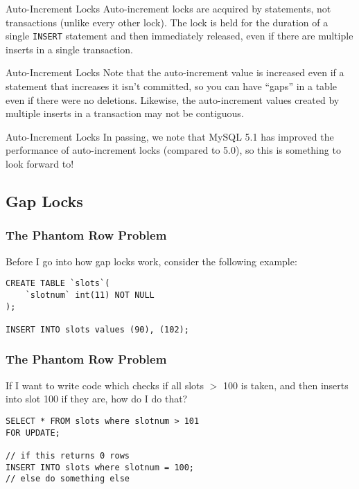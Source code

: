 \documentclass[14pt]{beamer}
\begin{document}
\begin{frame}{Auto-Increment Locks}
  Auto-increment locks are acquired by statements, not transactions (unlike
  every other lock).
  \newline
  \newline
  The lock is held for the duration of a single \texttt{INSERT} statement and
  then immediately released, even if there are multiple inserts in a single
  transaction.
\end{frame}

\begin{frame}{Auto-Increment Locks}
  Note that the auto-increment value is increased even if a statement that
  increases it isn't committed, so you can have ``gaps'' in a table even if
  there were no deletions.
  \newline
  \newline
  \pause
  Likewise, the auto-increment values created by multiple inserts in a
  transaction may not be contiguous.
\end{frame}

\begin{frame}{Auto-Increment Locks}
  In passing, we note that MySQL 5.1 has improved the performance of
  auto-increment locks (compared to 5.0), so this is something to look forward
  to!
\end{frame}

\subsection{Gap Locks}
\begin{frame}[fragile]
  \frametitle{The Phantom Row Problem}
  Before I go into how gap locks work, consider the following example:
  \begin{verbatim}
CREATE TABLE `slots`( 
    `slotnum` int(11) NOT NULL 
);

INSERT INTO slots values (90), (102);
  \end{verbatim}
\end{frame}

\begin{frame}[fragile]
  \frametitle{The Phantom Row Problem}
  If I want to write code which checks if all slots $>$ 100 is taken, and then
  inserts into slot 100 if they are, how do I do that?
  \begin{verbatim}
SELECT * FROM slots where slotnum > 101 
FOR UPDATE;

// if this returns 0 rows
INSERT INTO slots where slotnum = 100;
// else do something else
  \end{verbatim}
\end{frame}
\end{document}
